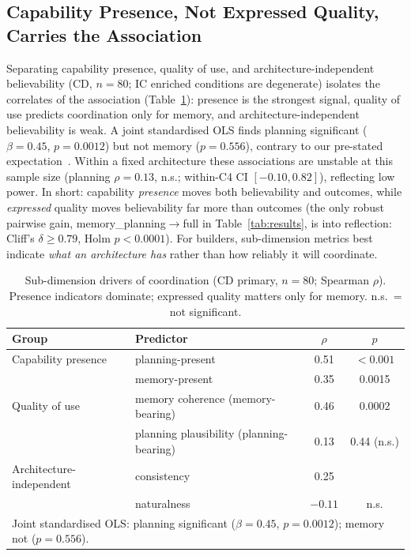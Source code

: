 \documentclass[runningheads]{llncs}
\begin{document}
\subsection{Capability Presence, Not Expressed Quality, Carries the Association}\label{sec:results-drivers}
Separating capability presence, quality of use, and architecture-independent believability (CD, $n=80$; IC enriched conditions are degenerate) isolates the correlates of the association (Table~\ref{tab:drivers}): presence is the strongest signal, quality of use predicts coordination only for memory, and architecture-independent believability is weak. A joint standardised OLS finds planning significant ($\beta=0.45$, $p=0.0012$) but not memory ($p=0.556$), contrary to our pre-stated expectation~\cite{park2023generative,hishiki2026memory}. Within a fixed architecture these associations are unstable at this sample size (planning $\rho=0.13$, n.s.; within-C4 CI $[-0.10,0.82]$), reflecting low power. In short: capability \emph{presence} moves both believability and outcomes, while \emph{expressed} quality moves believability far more than outcomes (the only robust pairwise gain, memory\_planning$\to$full in Table~\ref{tab:results}, is into reflection: Cliff's $\delta\geq0.79$, Holm $p<0.0001$). For builders, sub-dimension metrics best indicate \emph{what an architecture has} rather than how reliably it will coordinate.
\begin{table}[htbp]
\centering
\caption{Sub-dimension drivers of coordination (CD primary, $n=80$; Spearman $\rho$). Presence indicators dominate; expressed quality matters only for memory. n.s.\ = not significant.}
\label{tab:drivers}
\small
\setlength{\tabcolsep}{6pt}
\begin{tabular}{l l c c}
\toprule
Group & Predictor & $\rho$ & $p$ \\
\midrule
Capability presence & planning-present & 0.51 & $<0.001$ \\
                    & memory-present & 0.35 & 0.0015 \\
Quality of use & memory coherence (memory-bearing) & 0.46 & 0.0002 \\
               & planning plausibility (planning-bearing) & 0.13 & 0.44 (n.s.) \\
Architecture-independent & consistency & 0.25 & \\
                        & naturalness & $-0.11$ & n.s. \\
\midrule
\multicolumn{4}{l}{Joint standardised OLS: planning significant ($\beta=0.45$, $p=0.0012$); memory not ($p=0.556$).} \\
\bottomrule
\end{tabular}
\end{table}
\end{document}
